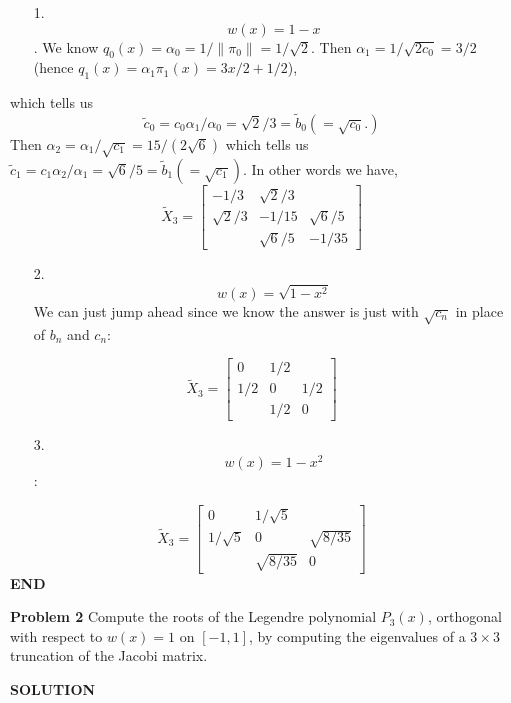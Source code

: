 \documentclass[12pt,a4paper]{article}
\def\bt{ {\tilde b} }
\def\ct{ {\tilde c} }
\def\Xt{ {\tilde X} }
\begin{document}
\begin{itemize}
\item[1. ] \[
w(x) = 1-x
\]
. We know $q_0(x) = \ensuremath{\alpha}_0 = 1/\|\ensuremath{\pi}_0\| = 1/\sqrt{2}$. Then $\ensuremath{\alpha}_1 = 1/\sqrt{2c_0} =3/2$ (hence $q_1(x) = \ensuremath{\alpha}_1 \ensuremath{\pi}_1(x) = 3x/2+ 1/2$),

\end{itemize}
which tells us
\[
\ct_0 = c_0 \ensuremath{\alpha}_1/\ensuremath{\alpha}_0 = \sqrt{2}/3 = \bt_0 (= \sqrt{c_0}.)
\]
Then $\ensuremath{\alpha}_2 = \ensuremath{\alpha}_1/\sqrt{c_1} = 15/(2\sqrt{6})$ which tells us $\ct_1 = c_1 \ensuremath{\alpha}_2/\ensuremath{\alpha}_1 = \sqrt{6}/5 = \bt_1 (= \sqrt{c_1})$. In other words we have,
\[
\Xt_3 = \begin{bmatrix}
-1/3 & \sqrt{2}/3 \\
 \sqrt{2}/3 & -1/15 & \sqrt{6}/5 \\
& \sqrt{6}/5 & -1/35
\end{bmatrix}
\]
\begin{itemize}
\item[2. ] \[
w(x) = \sqrt{1-x^2}
\]
We can just jump ahead since we know the answer is just with $\sqrt{c_n}$ in place of $b_n$ and $c_n$:

\end{itemize}
\[
\Xt_3 = \begin{bmatrix}
0 & 1/2 \\
1/2 & 0 & 1/2 \\
& 1/2 & 0
\end{bmatrix}
\]
\begin{itemize}
\item[3. ] \[
w(x) = 1-x^2
\]
:

\end{itemize}
\[
\Xt_3 = \begin{bmatrix}
0 & 1/\sqrt{5} \\
1/\sqrt{5} & 0 & \sqrt{8/35} \\
& \sqrt{8/35} & 0
\end{bmatrix}
\]
\textbf{END}

\textbf{Problem 2} Compute the roots of the Legendre polynomial $P_3(x)$, orthogonal with respect to $w(x) = 1$ on $[-1,1]$, by computing the eigenvalues of a $3 \ensuremath{\times} 3$ truncation of the Jacobi matrix.

\textbf{SOLUTION}
\end{document}
